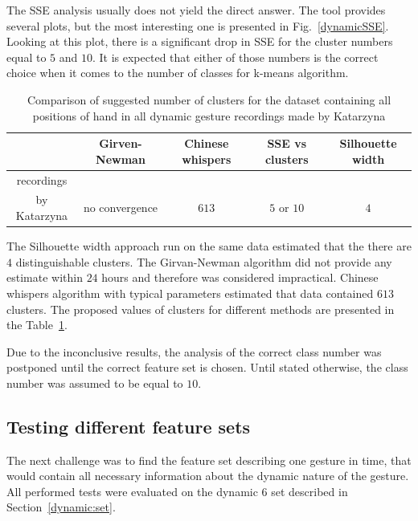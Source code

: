 The SSE analysis usually does not yield the direct answer.
The tool provides several plots, but the most interesting one is presented in Fig.~\ref{dynamicSSE}. 
Looking at this plot, there is a significant drop in SSE for the cluster numbers equal to $5$ and $10$.
It is expected that either of those numbers is the correct choice when it comes to the number of classes for k-means algorithm.

\begin{table}[htbp!]
 \caption{Comparison of suggested number of clusters for the dataset containing all positions of hand in all dynamic gesture recordings made by Katarzyna}
 \label{clusterwyn}
    \begin{tabular}{ccccc}
    \hline
     & Girven-Newman & Chinese whispers   & SSE vs clusters & Silhouette width  \\ \hline \hline
    recordings \\by Katarzyna          & no convergence      & $613$ & $5$ or $10$     & $4$     \\ \hline
    \end{tabular}
\end{table}

The Silhouette width approach run on the same data estimated that the there are $4$ distinguishable clusters.
The Girvan-Newman algorithm did not provide any estimate within $24$ hours and therefore was considered impractical.
Chinese whispers algorithm with typical parameters estimated that data contained $613$ clusters.
The proposed values of clusters for different methods are presented in the Table~\ref{clusterwyn}.

Due to the inconclusive results, the analysis of the correct class number was postponed until the correct feature set is chosen.
Until stated otherwise, the class number was assumed to be equal to $10$.

\subsection{Testing different feature sets}
The next challenge was to find the feature set describing one gesture in time, that would contain all necessary information about the dynamic nature of the gesture. 
All performed tests were evaluated on the dynamic 6 set described in Section~\ref{dynamic:set}.

